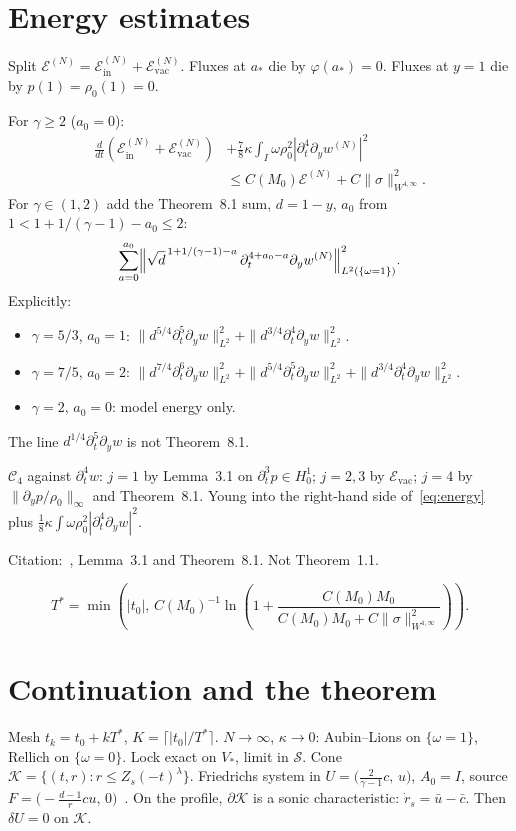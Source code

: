 \documentclass{amsart}
\theoremstyle{plain}
\theoremstyle{definition}
\begin{document}
\section{Energy estimates}
Split $\mathcal{E}^{(N)}=\mathcal{E}_{\mathrm{in}}^{(N)}+\mathcal{E}_{\mathrm{vac}}^{(N)}$.
Fluxes at $a_*$ die by $\varphi(a_*)=0$.
Fluxes at $y=1$ die by $p(1)=\rho_0(1)=0$.

For $\gamma\ge2$ ($a_0=0$):
\begin{equation}
\label{eq:energy}
\begin{split}
\frac{d}{dt}(\mathcal{E}_{\mathrm{in}}^{(N)}+\mathcal{E}_{\mathrm{vac}}^{(N)})
&+\frac78\kappa\int_I\omega\rho_0^2|\partial_t^4\partial_y w^{(N)}|^2 \\
&\le C(M_0)\mathcal{E}^{(N)}+C\|\sigma\|_{W^{4,\infty}}^2.
\end{split}
\end{equation}
For $\gamma\in(1,2)$ add the Theorem~8.1 sum, $d=1-y$,
$a_0$ from $1<1+1/(\gamma-1)-a_0\le2$:
\[
\sum_{a=0}^{a_0}
\Bigl\|
\sqrt{d}^{\,1+1/(\gamma-1)-a}\,
\partial_t^{4+a_0-a}\partial_y w^{(N)}
\Bigr\|_{L^2(\{\omega=1\})}^2.
\]
Explicitly:
\begin{itemize}
\item $\gamma=5/3$, $a_0=1$:
$\|d^{5/4}\partial_t^5\partial_y w\|_{L^2}^2
+\allowbreak\|d^{3/4}\partial_t^4\partial_y w\|_{L^2}^2$.
\item $\gamma=7/5$, $a_0=2$:
$\|d^{7/4}\partial_t^6\partial_y w\|_{L^2}^2
+\allowbreak\|d^{5/4}\partial_t^5\partial_y w\|_{L^2}^2
+\allowbreak\|d^{3/4}\partial_t^4\partial_y w\|_{L^2}^2$.
\item $\gamma=2$, $a_0=0$: model energy only.
\end{itemize}
The line $d^{1/4}\partial_t^5\partial_y w$ is not Theorem~8.1.

$\mathcal{C}_4$ against $\partial_t^4 w$:
$j=1$ by Lemma~3.1 on $\partial_t^3 p\in H_0^1$;
$j=2,3$ by $\mathcal{E}_{\mathrm{vac}}$;
$j=4$ by $\|\partial_y p/\rho_0\|_\infty$ and Theorem~8.1.
Young into the right-hand side of~\eqref{eq:energy} plus
$\frac18\kappa\int\omega\rho_0^2|\partial_t^4\partial_y w|^2$.

Citation:~\cite{CS2011}, Lemma~3.1 and Theorem~8.1.
Not Theorem~1.1.

\[
T^*=\min\left(|t_0|,\,
C(M_0)^{-1}\ln\left(1+\frac{C(M_0)M_0}{C(M_0)M_0+C\|\sigma\|_{W^{4,\infty}}^2}\right)
\right).
\]

\section{Continuation and the theorem}
Mesh $t_k=t_0+kT^*$, $K=\lceil|t_0|/T^*\rceil$.
$N\to\infty$, $\kappa\to0$: Aubin--Lions on $\{\omega=1\}$,
Rellich on $\{\omega=0\}$.
Lock exact on $V_*$, limit in $\mathcal{S}$.
Cone $\mathcal{K}=\{(t,r):r\le Z_s(-t)^\lambda\}$.
Friedrichs system in $U=\bigl(\tfrac{2}{\gamma-1}c,\,u\bigr)$, $A_0=I$,
source $F=\bigl(-\tfrac{d-1}{r}cu,\,0\bigr)$~\cite{Kato1975}.
On the profile, $\partial\mathcal{K}$ is a sonic characteristic:
$\dot r_s=\bar u-\bar c$. Then $\delta U=0$ on $\mathcal{K}$.
\end{document}
